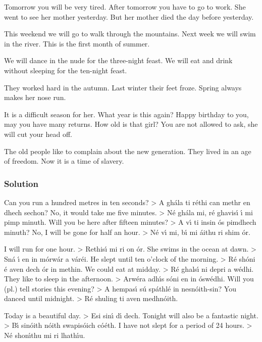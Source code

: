 Tomorrow you will be very tired.
After tomorrow you have to go to work.
She went to see her mother yesterday.
But her mother died the day before yesterday.

This weekend we will go to walk through the mountains.
Next week we will swim in the river.
This is the first month of summer.

We will dance in the nude for the three-night feast.
We will eat and drink without sleeping for the ten-night feast.

They worked hard in the autumn.
Last winter their feet froze.
Spring always makes her nose run.

It is a difficult season for her.
What year is this again?
Happy birthday to you, may you have many returns.
How old is that girl?
You are not allowed to ask, she will cut your head off.

The old people like to complain about the new generation.
They lived in an age of freedom.
Now it is a time of slavery.

\newpage
\subsubsection{Solution}

Can you run a hundred metres in ten seconds? > A gh\'{a}la ti r\'{e}thi can methr en dhech sechon?
No, it would take me five minutes. > N\'{e} gh\'{a}la mi, r\'{e} ghavis\'{\i} \'{\i} mi pimp minuth.
Will you be here after fifteen minutes? > A v\'{\i} ti insin \'{o}s pimdhech minuth?
No, I will be gone for half an hour. > N\'{e} v\'{\i} mi, b\'{\i} mi \'{a}ithu ri shim \'{o}r.

I will run for one hour. > Rethis\'{\i} mi ri on \'{o}r.
She swims in the ocean at dawn. > Sn\'{a} \'{\i} en in m\'{o}rw\'{a}r a v\'{a}r\'{e}i.
He slept until ten o’clock of the morning. > R\'{e} sh\'{o}ni \'{e} aven dech \'{o}r in methin.
We could eat at midday. > R\'{e} ghals\'{\i} ni depri a w\'{e}dhi.
They like to sleep in the afternoon. > Arw\'{e}ra adh\'{\i}s s\'{o}ni en in \'{o}sw\'{e}dhi.
Will you (pl.) tell stories this evening? > A hempas\'{\i} s\'{u} sp\'{a}thl\'{e} in nesn\'{o}ith-sin?
You danced until midnight. > R\'{e} shuling ti aven medhn\'{o}ith.

Today is a beautiful day. > Esi sin\'{\i} d\'{\i} dech.
Tonight will also be a fantastic night. > B\'{\i} sin\'{o}ith n\'{o}ith swapis\'{o}ich c\'{o}\'{e}th.
I have not slept for a period of 24 hours. > N\'{e} shon\'{\i}thu mi ri lhath\'{\i}u.

